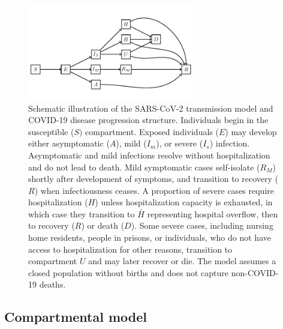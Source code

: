\documentclass[11pt]{article}
\begin{document}
\begin{figure}
	\begin{center}
		\includegraphics[width=0.65\textwidth]{model_diagram_ct.pdf}
	\end{center}
	\caption{Schematic illustration of the SARS-CoV-2 transmission model and COVID-19 disease progression structure.  Individuals begin in the susceptible ($S)$ compartment. Exposed individuals ($E$) may develop either asymptomatic ($A$), mild ($I_m$), or severe ($I_s$) infection. Asymptomatic and mild infections resolve without hospitalization and do not lead to death. Mild symptomatic cases self-isolate ($R_M$) shortly after development of symptoms, and transition to recovery ($R$) when infectiousness ceases. A proportion of severe cases require hospitalization ($H$) unless hospitalization capacity is exhausted, in which case they transition to $\bar{H}$ representing hospital overflow, then to recovery ($R$) or death ($D$). Some severe cases, including nursing home residents, people in prisons, or individuals, who do not have access to hospitalization for other reasons, transition to compartment $U$ and may later recover or die. The model assumes a closed population without births and does not capture non-COVID-19 deaths.}
	\label{fig:model}
\end{figure}



\subsection{Compartmental model}
\end{document}
